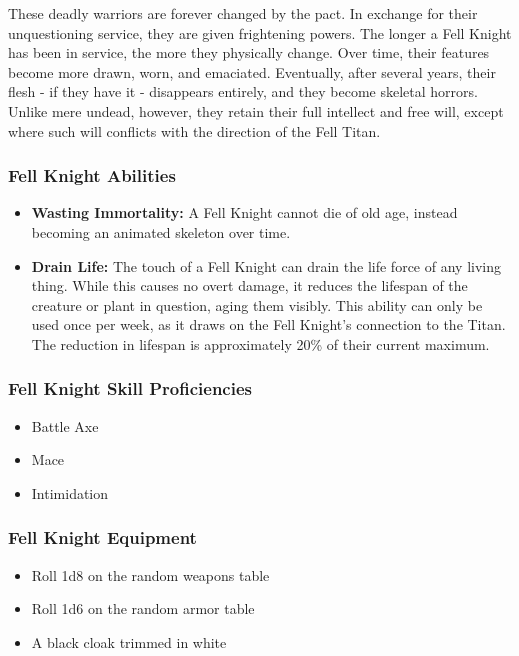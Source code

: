 \begin{multicols}{2}
These deadly warriors are forever changed by the pact. In exchange for
their unquestioning service, they are given frightening powers. The longer
a Fell Knight has been in service, the more they physically change. Over
time, their features become more drawn, worn, and emaciated. Eventually,
after several years, their flesh - if they have it - disappears entirely,
and they become skeletal horrors. Unlike mere undead, however, they retain
their full intellect and free will, except where such will conflicts with
the direction of the Fell Titan.

\subsubsection{Fell Knight Abilities}

\begin{itemize}
  \item \textbf{Wasting Immortality:} A Fell Knight cannot die of old age,
    instead becoming an animated skeleton over time.
  \item \textbf{Drain Life:} The touch of a Fell Knight can drain the life
    force of any living thing. While this causes no overt damage, it reduces
    the lifespan of the creature or plant in question, aging them visibly.
    This ability can only be used once per week, as it draws on the Fell
    Knight's connection to the Titan. The reduction in lifespan is
    approximately 20\% of their current maximum.
\end{itemize}

\subsubsection{Fell Knight Skill Proficiencies}

\begin{itemize}
  \item Battle Axe
  \item Mace
  \item Intimidation
\end{itemize}

\subsubsection{Fell Knight Equipment}

\begin{itemize}
  \item Roll 1d8 on the random weapons table
  \item Roll 1d6 on the random armor table
  \item A black cloak trimmed in white
\end{itemize}


\end{multicols}
